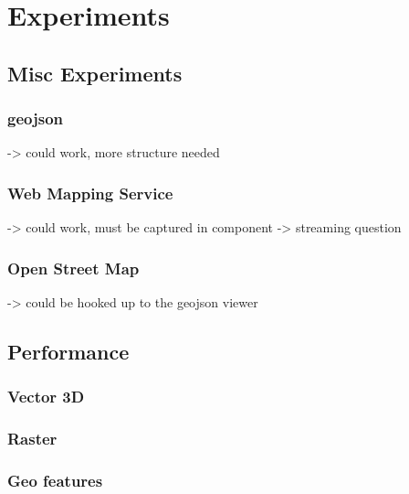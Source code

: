 \chapter{Experiments}%







\section{ Misc Experiments }

\subsection{ geojson }
-> could work, more structure needed

\subsection{ Web Mapping Service }
-> could work, must be captured in component
-> streaming question

\subsection{ Open Street Map }
-> could be hooked up to the geojson viewer



\section{ Performance }


\subsection{Vector 3D}

\subsection{Raster}

\subsection{Geo features}

